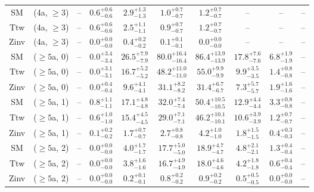 \begin{table}[h!]
{\begin{tabular}{cccccccccc}
	SM & (4a, $\ge3$) & -- & $0.6^{+ 0.6 }_{- 0.6 }$ & $2.9^{+ 1.3 }_{- 1.3 }$ & $1.0^{+ 0.7 }_{- 0.7 }$ & $1.2^{+ 0.7 }_{- 0.7 }$ & -- & -- & -- \\[0.5ex] 
	Ttw & (4a, $\ge3$) & -- & $0.6^{+ 0.6 }_{- 0.6 }$ & $2.5^{+ 1.1 }_{- 1.1 }$ & $0.9^{+ 0.7 }_{- 0.7 }$ & $1.2^{+ 0.7 }_{- 0.7 }$ & -- & -- & -- \\[0.5ex] 
	Zinv & (4a, $\ge3$) & -- & $0.0^{+ 0.0 }_{- 0.0 }$ & $0.4^{+ 0.2 }_{- 0.2 }$ & $0.1^{+ 0.1 }_{- 0.1 }$ & $0.0^{+ 0.0 }_{- 0.0 }$ & -- & -- & -- \\[0.5ex] 
	SM & ($\ge5$a, 0) & -- & $0.0^{+ 3.4 }_{- 3.4 }$ & $26.5^{+ 7.9 }_{- 7.9 }$ & $80.0^{+ 16.4 }_{- 16.4 }$ & $86.4^{+ 13.9 }_{- 13.9 }$ & $17.8^{+ 7.6 }_{- 7.6 }$ & $6.8^{+ 1.9 }_{- 1.9 }$ & -- \\[0.5ex] 
	Ttw & ($\ge5$a, 0) & -- & $0.0^{+ 3.1 }_{- 3.1 }$ & $16.7^{+ 5.2 }_{- 5.2 }$ & $48.2^{+ 11.0 }_{- 11.0 }$ & $55.0^{+ 9.9 }_{- 9.9 }$ & $9.9^{+ 3.5 }_{- 3.5 }$ & $1.4^{+ 0.8 }_{- 0.8 }$ & -- \\[0.5ex] 
	Zinv & ($\ge5$a, 0) & -- & $0.0^{+ 0.4 }_{- 0.4 }$ & $9.6^{+ 4.1 }_{- 4.1 }$ & $31.1^{+ 8.2 }_{- 8.2 }$ & $31.4^{+ 6.7 }_{- 6.7 }$ & $7.3^{+ 5.7 }_{- 5.7 }$ & $1.9^{+ 1.6 }_{- 1.6 }$ & -- \\[0.5ex] 
	SM & ($\ge5$a, 1) & -- & $0.8^{+ 1.1 }_{- 1.1 }$ & $17.1^{+ 4.8 }_{- 4.8 }$ & $32.0^{+ 7.4 }_{- 7.4 }$ & $50.4^{+ 10.5 }_{- 10.5 }$ & $12.9^{+ 4.4 }_{- 4.4 }$ & $3.3^{+ 0.8 }_{- 0.8 }$ & -- \\[0.5ex] 
	Ttw & ($\ge5$a, 1) & -- & $0.6^{+ 1.0 }_{- 1.0 }$ & $15.4^{+ 4.5 }_{- 4.5 }$ & $29.0^{+ 7.1 }_{- 7.1 }$ & $46.2^{+ 10.1 }_{- 10.1 }$ & $10.6^{+ 3.9 }_{- 3.9 }$ & $1.2^{+ 0.7 }_{- 0.7 }$ & -- \\[0.5ex] 
	Zinv & ($\ge5$a, 1) & -- & $0.1^{+ 0.2 }_{- 0.2 }$ & $1.7^{+ 0.7 }_{- 0.7 }$ & $2.7^{+ 0.8 }_{- 0.8 }$ & $4.2^{+ 1.0 }_{- 1.0 }$ & $1.8^{+ 1.5 }_{- 1.5 }$ & $0.4^{+ 0.3 }_{- 0.3 }$ & -- \\[0.5ex] 
	SM & ($\ge5$a, 2) & -- & $0.0^{+ 0.0 }_{- 0.0 }$ & $4.0^{+ 1.7 }_{- 1.7 }$ & $17.7^{+ 5.0 }_{- 5.0 }$ & $18.9^{+ 4.7 }_{- 4.7 }$ & $4.8^{+ 2.1 }_{- 2.1 }$ & $1.3^{+ 0.4 }_{- 0.4 }$ & -- \\[0.5ex] 
	Ttw & ($\ge5$a, 2) & -- & $0.0^{+ 0.0 }_{- 0.0 }$ & $3.8^{+ 1.6 }_{- 1.6 }$ & $16.7^{+ 4.9 }_{- 4.9 }$ & $18.0^{+ 4.6 }_{- 4.6 }$ & $4.2^{+ 1.8 }_{- 1.8 }$ & $0.6^{+ 0.4 }_{- 0.4 }$ & -- \\[0.5ex] 
	Zinv & ($\ge5$a, 2) & -- & $0.0^{+ 0.0 }_{- 0.0 }$ & $0.2^{+ 0.1 }_{- 0.1 }$ & $0.8^{+ 0.2 }_{- 0.2 }$ & $0.9^{+ 0.2 }_{- 0.2 }$ & $0.5^{+ 0.5 }_{- 0.5 }$ & $0.0^{+ 0.0 }_{- 0.0 }$ & -- \\[0.5ex] 

\end{tabular}}
\end{table}

